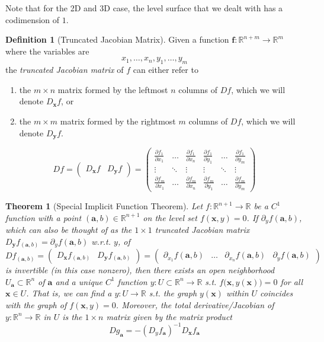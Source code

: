 \documentclass{article}
\newtheorem{theorem}{Theorem}[section]
\theoremstyle{remark}
\theoremstyle{definition}
\newtheorem{definition}{Definition}[section]
\begin{document}
Note that for the 2D and 3D case, the level surface that we dealt with has a codimension of $1$. 

\begin{definition}[Truncated Jacobian Matrix]
Given a function $\mathbf{f}: \mathbb{R}^{n+m} \longrightarrow \mathbb{R}^m$ where the variables are 
\[x_1, \ldots, x_n, y_1, \ldots, y_m\]
the \textit{truncated Jacobian matrix} of $f$ can either refer to
\begin{enumerate}
    \item the $m \times n$ matrix formed by the leftmost $n$ columns of $D f$, which we will denote $D_\mathbf{x} f$, or 
    \item the $m \times m$ matrix formed by the rightmost $m$ columns of $D f$, which we will denote $D_\mathbf{y} f$. 
\end{enumerate}
\[D f = \begin{pmatrix} D_\mathbf{x} f & D_\mathbf{y} f \end{pmatrix} = \left(\begin{array}{ccc|ccc}
   \frac{\partial f_1}{\partial x_1} &\ldots &\frac{\partial f_1}{\partial x_n} & \frac{\partial f_1}{\partial y_1} & \ldots & \frac{\partial f_1}{\partial y_m}\\
   \vdots & \ddots & \vdots & \vdots & \ddots & \vdots \\
   \frac{\partial f_m}{\partial x_1} &\ldots &\frac{\partial f_m}{\partial x_n} & \frac{\partial f_m}{\partial y_1} & \ldots & \frac{\partial f_m}{\partial y_m}
   \end{array}\right)\]
\end{definition}

\begin{theorem}[Special Implicit Function Theorem]
Let $f: \mathbb{R}^{n+1} \longrightarrow \mathbb{R}$ be a $C^1$ function with a point $(\mathbf{a}, b) \in \mathbb{R}^{n+1}$ on the level set $f(\mathbf{x}, y) = 0$. If $\partial_y f (\mathbf{a}, b)$, which can also be thought of as the $1 \times 1$ truncated Jacobian matrix $D_\mathbf{y} f_{(\mathbf{a}, b)} = \partial_{y} f(\mathbf{a}, b)$ w.r.t. $y$, of 
\[D f_{(\mathbf{a}, b)} = \begin{pmatrix} D_\mathbf{x} f_{(\mathbf{a}, b)} & D_\mathbf{y} f_{(\mathbf{a}, b)} \end{pmatrix} = \left(\begin{array}{ccc|c}
   \partial_{x_1} f(\mathbf{a}, b) &\ldots & \partial_{x_n} f(\mathbf{a}, b) & \partial_{y} f(\mathbf{a}, b)
   \end{array}\right)\]
is invertible (in this case nonzero), then there exists an open neighborhood $U_\mathbf{a} \subset \mathbb{R}^n$ of $\mathbf{a}$ and a unique $C^1$ function $y: U \subset \mathbb{R}^n \longrightarrow \mathbb{R}$ s.t. $f\big(\mathbf{x}, y(\mathbf{x})\big) = 0$ for all $\mathbf{x} \in U$. That is, we can find a $y: U \longrightarrow \mathbb{R}$ s.t. the graph $y(\mathbf{x})$ within $U$ coincides with the graph of $f(\mathbf{x}, y) = 0$. Moreover, the total derivative/Jacobian of $y: \mathbb{R}^n \longrightarrow \mathbb{R}$ in $U$ is the $1 \times n$ matrix given by the matrix product
\[D g_\mathbf{a} = - (D_y f_\mathbf{a})^{-1} D_\mathbf{x} f_\mathbf{a}\]
\end{theorem}
\end{document}

